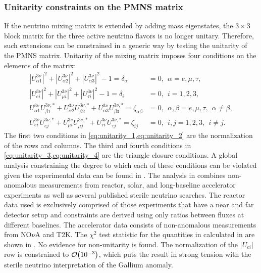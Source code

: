 \subsubsection{Unitarity constraints on the PMNS matrix}
If the neutrino mixing matrix is extended by adding mass eigenstates, the $3\times3$ block matrix for the three active neutrino flavors is no longer unitary.
Therefore, such extensions can be constrained in a generic way by testing the unitarity of the PMNS matrix.
Unitarity of the mixing matrix imposes four conditions on the elements of the matrix:
\begin{align}
    |U^{3\nu}_{\alpha 1}|^2 + |U^{3\nu}_{\alpha 2}|^2 + |U^{3\nu}_{\alpha 3}|^2 - 1 = \delta_\alpha &= 0,~~\alpha=e,\mu,\tau, \label{eq:unitarity_1}
    \\
    |U^{3\nu}_{e i}|^2 + |U^{3\nu}_{\mu i}|^2 + |U^{3\nu}_{\tau i}|^2 -1 = \delta_i &= 0,~~i=1,2,3, \label{eq:unitarity_2}
    \\
    U^{3\nu}_{\alpha 1}U^{3\nu,*}_{\beta 1} + U^{3\nu}_{\alpha 2}U^{3\nu,*}_{\beta 2} + U^{3\nu}_{\alpha 3}U^{3\nu,*}_{\beta 3} = \zeta_{\alpha\beta} &= 0,~~\alpha, \beta = e,\mu,\tau,~~\alpha\neq\beta, \label{eq:unitarity_3}
    \\
    U^{3\nu}_{e i}U^{3\nu,*}_{e j} + U^{3\nu}_{\mu i}U^{3\nu,*}_{\mu j} + U^{3\nu}_{\tau i}U^{3\nu,*}_{\tau j} = \zeta_{ij} &= 0,~~i,j  =1,2,3,~~i\neq j.
\label{eq:unitarity_4}
\end{align}
The first two conditions in \cref{eq:unitarity_1,eq:unitarity_2} are the normalization of the rows and columns. The third and fourth conditions in \cref{eq:unitarity_3,eq:unitarity_4} are the triangle closure conditions. A global analysis constraining the degree to which each of these conditions can be violated given the experimental data can be found in . The analysis in \cite{global_unitarity_Hu} combines non-anomalous measurements from reactor, solar, and long-baseline accelerator experiments as well as several published sterile neutrino searches. The reactor data used is exclusively comprised of those experiments that have a near and far detector setup and constraints are derived using only ratios between fluxes at different baselines. The accelerator data consists of non-anomalous measurements from NO$\nu$A and T2K. The $\chi^2$ test statistic for the quantities in  calculated in \cite{global_unitarity_Hu} are shown in . No evidence for non-unitarity is found. The normalization of the $|U_{ei}|$ row is constrained to $\order{\num{e-3}}$, which puts the result in strong tension with the sterile neutrino interpretation of the Gallium anomaly.
